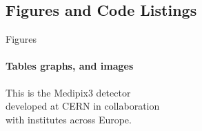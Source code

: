 \documentclass[xcolor=svgnames,10pt,aspectratio=169]{beamer}
\begin{document}
    \subsection{Figures and Code Listings}
    \begin{frame}[label=figs1]{Figures}
    	\framesubtitle{Tables graphs, and images}
      This is the Medipix3 detector\\
      developed at CERN in collaboration\\
      with institutes across Europe.
    \end{frame}
\end{document}
